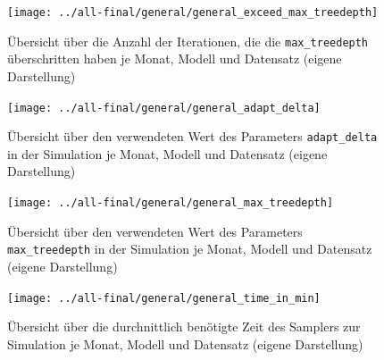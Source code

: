 \documentclass[ngerman]{ttlab-qualify}
\begin{document}
\newpage

\begin{figure}[H]
\begin{center}
\texttt{[image: ../all-final/general/general\_exceed\_max\_treedepth]}
\caption{Übersicht über die Anzahl der Iterationen, die die \texttt{max\_treedepth} überschritten haben je Monat, Modell und Datensatz (eigene Darstellung)}
\label{fig:general_exceed-max-treedepth}
\end{center}
\end{figure}

\begin{figure}[H]
\begin{center}
\texttt{[image: ../all-final/general/general\_adapt\_delta]}
\caption{Übersicht über den verwendeten Wert des Parameters \texttt{adapt\_delta} in der Simulation je Monat, Modell und Datensatz (eigene Darstellung)}
\label{fig:general_adapt_delta}
\end{center}
\end{figure}

\newpage

\begin{figure}[H]
\begin{center}
\texttt{[image: ../all-final/general/general\_max\_treedepth]}
\caption{Übersicht über den verwendeten Wert des Parameters \texttt{max\_treedepth} in der Simulation je Monat, Modell und Datensatz (eigene Darstellung)}
\label{fig:general_max_treedepth}
\end{center}
\end{figure}

\begin{figure}[H]
\begin{center}
\texttt{[image: ../all-final/general/general\_time\_in\_min]}
\caption{Übersicht über die durchnittlich benötigte Zeit des Samplers zur Simulation je Monat, Modell und Datensatz (eigene Darstellung)}
\label{fig:general_time-in-min}
\end{center}
\end{figure}

\newpage
\end{document}
